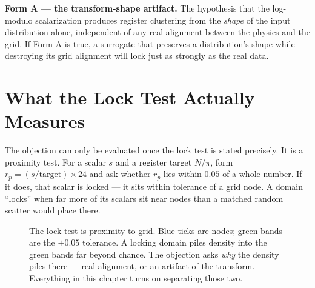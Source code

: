 \documentclass[11pt, letterpaper, openany]{book}
\begin{document}
\begin{warningbox}
\textbf{Form A --- the transform-shape artifact.} The hypothesis that the log-modulo
scalarization produces register clustering from the \emph{shape} of the input
distribution alone, independent of any real alignment between the physics and the grid.
If Form A is true, a surrogate that preserves a distribution's shape while destroying
its grid alignment will lock just as strongly as the real data.
\end{warningbox}
 
\section{What the Lock Test Actually Measures}
 
The objection can only be evaluated once the lock test is stated precisely. It is a
proximity test. For a scalar $s$ and a register target $N/\pi$, form $r_p = (s/\text{target})
\times 24$ and ask whether $r_p$ lies within $0.05$ of a whole number. If it does, that
scalar is locked --- it sits within tolerance of a grid node. A domain ``locks'' when far
more of its scalars sit near nodes than a matched random scatter would place there.
 
\begin{figure}[H]
\centering
{}
\caption{The lock test is proximity-to-grid. Blue ticks are nodes; green bands are the
$\pm0.05$ tolerance. A locking domain piles density into the green bands far beyond
chance. The objection asks \emph{why} the density piles there --- real alignment, or an
artifact of the transform. Everything in this chapter turns on separating those two.}
\label{fig:nl_lock}
\end{figure}
 
\end{document}
